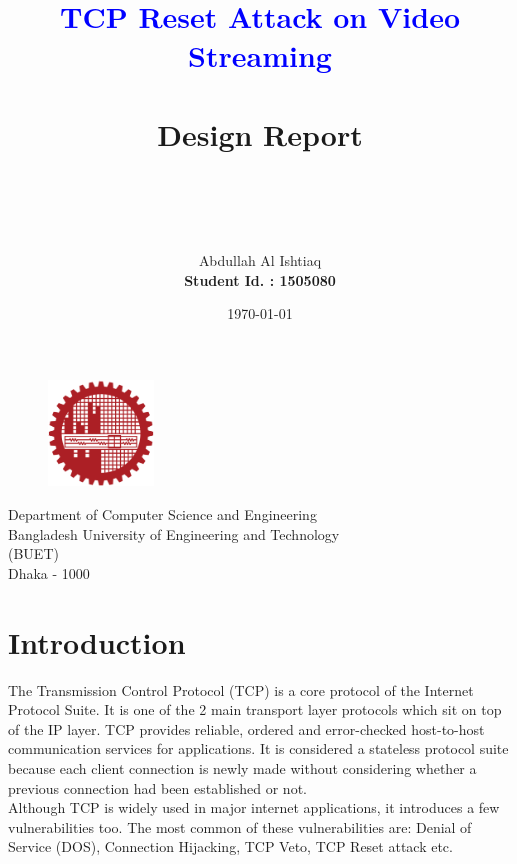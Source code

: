 \documentclass[14pt]{extarticle}
\title{\Huge{\textcolor{blue}{TCP Reset Attack on Video Streaming}} \\ ~\\
        \LARGE{Design Report} \\ ~ \\ ~ \\ }
\author{Abdullah Al Ishtiaq \\
        \textbf{Student Id. : 1505080}}
\date{\today}
\begin{document}
\maketitle

\vspace{1cm}

\begin{figure}[h!]
\centering
    \includegraphics[width = 0.25\textwidth]{Pictures/logoBUET.png}
\end{figure}
\begin{center}
\vspace{.5cm}

\Large{Department of Computer Science and Engineering \\
    Bangladesh University of Engineering and Technology \\
    (BUET) \\
    Dhaka - 1000 }

\end{center}

\newpage

\tableofcontents
\newpage

\listoffigures
\newpage


\section{Introduction}
    The Transmission Control Protocol (TCP) is a core protocol of the Internet Protocol Suite. It is one of the 2 main transport layer protocols which sit on top of the IP layer. TCP provides reliable, ordered and error-checked host-to-host communication services for applications. It is considered a stateless protocol suite because each client connection is newly made without considering whether a previous connection had been established or not. \\
    Although TCP is widely used in major internet applications, it introduces a few vulnerabilities too. The most common of these vulnerabilities are: Denial of Service (DOS), Connection Hijacking, TCP Veto, TCP Reset attack etc.
\end{document}
